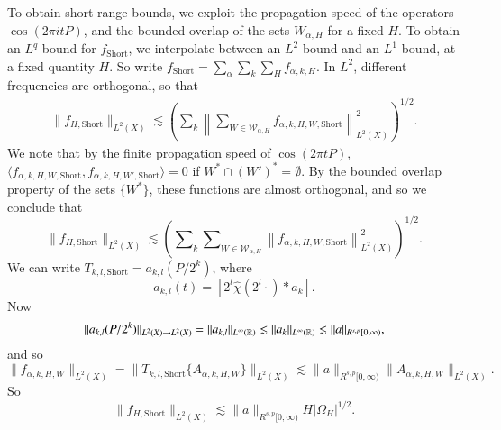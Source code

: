 To obtain short range bounds, we exploit the propagation speed of the operators $\cos(2 \pi i t P)$, and the bounded overlap of the sets $W_{\alpha,H}$ for a fixed $H$. To obtain an $L^q$ bound for $f_{\text{Short}}$, we interpolate between an $L^2$ bound and an $L^1$ bound, at a fixed quantity $H$. So write $f_{\text{Short}} = \sum_\alpha \sum_k \sum_H f_{\alpha,k,H}$.
%
In $L^2$, different frequencies are orthogonal, so that
%
\begin{equation}
\begin{split}
    \| f_{H,\text{Short}} \|_{L^2(X)} \lesssim \left( \sum\nolimits_k \left\| \sum\nolimits_{W \in \mathcal{W}_{\alpha,H}} f_{\alpha,k,H,W,\text{Short}} \right\|_{L^2(X)}^2 \right)^{1/2}.
\end{split}
\end{equation}
%
We note that by the finite propagation speed of $\cos(2 \pi t P)$, $\langle f_{\alpha,k,H,W,\text{Short}}, f_{\alpha,k,H,W',\text{Short}} \rangle = 0$ if $W^* \cap (W')^* = \emptyset$. By the bounded overlap property of the sets $\{ W^* \}$, these functions are almost orthogonal, and so we conclude that
%
\begin{equation}
    \| f_{H,\text{Short}} \|_{L^2(X)} \lesssim \left( \sum\nolimits_k \sum\nolimits_{W \in \mathcal{W}_{\alpha,H}} \left\| f_{\alpha,k,H,W,\text{Short}} \right\|_{L^2(X)}^2 \right)^{1/2}.
\end{equation}
%
We can write $T_{k,l,\text{Short}} = a_{k,l}(P / 2^k)$, where
%
\begin{equation}
    a_{k,l}(t) = [2^l \widehat{\chi}(2^l \cdot) * a_k].
\end{equation}
%
Now
%
\begin{equation}
    \| a_{k,l}(P/2^k) \|_{L^2(X) \to L^2(X)} = \| a_{k,l} \|_{L^\infty(\operatorname{\mathbb{R}})} \lesssim \| a_k \|_{L^\infty(\operatorname{\mathbb{R}})} \lesssim \| a \|_{R^{s,p}[0,\infty)}, 
\end{equation}
%
and so
%
\begin{equation}
    \| f_{\alpha,k,H,W} \|_{L^2(X)} = \| T_{k,l,\text{Short}} \{ A_{\alpha,k,H,W} \} \|_{L^2(X)} \lesssim \| a \|_{R^{s,p}[0,\infty)} \| A_{\alpha,k,H,W} \|_{L^2(X)}.
\end{equation}
%
So
%
\begin{equation}
    \| f_{H,\text{Short}} \|_{L^2(X)} \lesssim \| a \|_{R^{s,p}[0,\infty)} H |\Omega_H|^{1/2}.
\end{equation}
